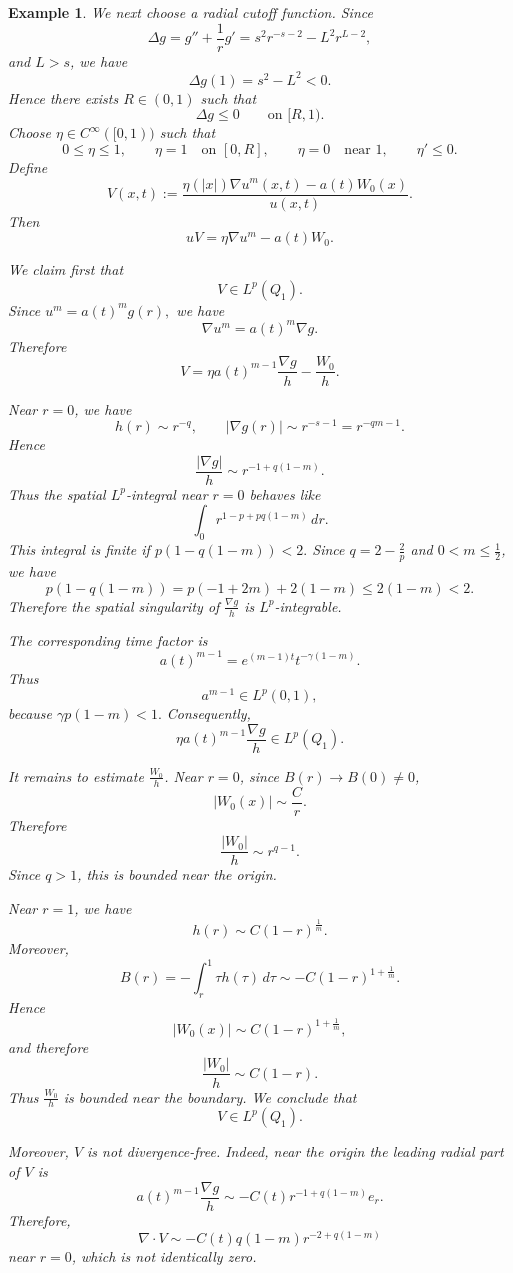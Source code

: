 \documentclass{amsart}
\newtheorem{example}[defn]{Example}
\numberwithin{equation}{section}
\begin{document}
\begin{example}
We next choose a radial cutoff function. Since
\[
\Delta g
=
g''+\frac{1}{r} g'
=
s^2r^{-s-2}-L^2r^{L-2},
\]
and \(L>s\), we have
\[
\Delta g(1)=s^2-L^2<0.
\]
Hence there exists \(R\in(0,1)\) such that
\[
\Delta g\le0
\qquad
\text{on }[R,1).
\]
Choose \(\eta\in C^\infty([0,1))\) such that
\[
0\le\eta\le1,
\qquad
\eta=1\quad\text{on }[0,R],
\qquad
\eta=0\quad\text{near }1,
\qquad
\eta'\le0.
\]
Define
\[
V(x,t):=
\frac{\eta(|x|)\nabla u^m(x,t)-a(t)W_0(x)}{u(x,t)}.
\]
Then
\[
uV=\eta\nabla u^m-a(t)W_0.
\]

We claim first that
\[
V\in L^p(Q_1).
\]
Since
\(
u^m=a(t)^m g(r),
\)
we have
\[
\nabla u^m=a(t)^m\nabla g.
\]
Therefore
\[
V
=
\eta a(t)^{m-1}\frac{\nabla g}{h}
-
\frac{W_0}{h}.
\]

Near \(r=0\), we have
\[
h(r)\sim r^{-q},
\qquad
|\nabla g(r)|\sim r^{-s-1}=r^{-qm-1}.
\]
Hence
\[
\frac{|\nabla g|}{h}
\sim
r^{-1+q(1-m)}.
\]
Thus the spatial \(L^p\)-integral near \(r=0\) behaves like
\[
\int_0 r^{1-p+pq(1-m)}\,dr.
\]
This integral is finite if
\(
p\left(1-q(1-m)\right)<2.
\)
Since \(q=2-\frac{2}{p}\) and \(0<m\le\frac{1}{2}\), we have 
\[
p\left(1-q(1-m)\right)=p(-1+2m)+2(1-m)\le2(1-m)<2.
\]
Therefore the spatial singularity of \(\frac{\nabla g}{h}\) is \(L^p\)-integrable.

The corresponding time factor is
\[
a(t)^{m-1}
=
e^{(m-1)t}t^{-\gamma(1-m)}.
\]
Thus
\[
a^{m-1}\in L^p(0,1),
\]
because
\(
\gamma p(1-m)<1.
\)
Consequently,
\[
\eta a(t)^{m-1}\frac{\nabla g}{h}\in L^p(Q_1).
\]

It remains to estimate \(\frac{W_0}{h}\). Near \(r=0\), since \(B(r)\to B(0)\ne0\),
\[
|W_0(x)|\sim \frac{C}{r}.
\]
Therefore
\[
\frac{|W_0|}{h}
\sim
r^{q-1}.
\]
Since \(q>1\), this is bounded near the origin.

Near \(r=1\), we have
\[
h(r)\sim C(1-r)^{\frac{1}{m}}.
\]
Moreover,
\[
B(r)
=
-\int_r^1 \tau h(\tau)\,d\tau
\sim
-C(1-r)^{1+\frac{1}{m}}.
\]
Hence
\[
|W_0(x)|\sim C(1-r)^{1+\frac{1}{m}},
\]
and therefore
\[
\frac{|W_0|}{h}
\sim
C(1-r).
\]
Thus \(\frac{W_0}{h}\) is bounded near the boundary. We conclude that
\[
V\in L^p(Q_1).
\]

Moreover, \(V\) is not divergence-free. Indeed, near the origin the leading
radial part of \(V\) is
\[
a(t)^{m-1}\frac{\nabla g}{h}
\sim
-C(t)r^{-1+q(1-m)}e_r.
\]
Therefore,
\[
\nabla\cdot V
\sim
-C(t)q(1-m)r^{-2+q(1-m)}
\]
near \(r=0\), which is not identically zero.


\end{example}
\end{document}
